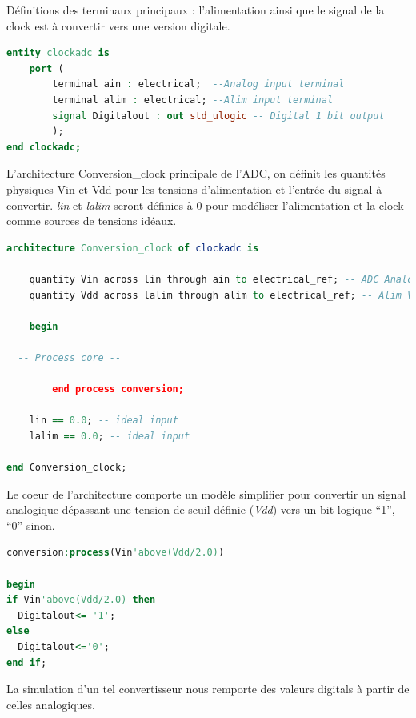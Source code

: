 \documentclass[a4paper]{article}
\begin{document}
D\'efinitions des terminaux principaux : l'alimentation ainsi que
le signal de la clock est \`a convertir vers une version digitale.
\begin{lstlisting}[language=VHDL, belowskip=-0.5 \baselineskip]
entity clockadc is
	port (
		terminal ain : electrical;  --Analog input terminal
		terminal alim : electrical; --Alim input terminal
		signal Digitalout : out std_ulogic -- Digital 1 bit output
		);
end clockadc;
\end{lstlisting}

\clearpage
L'architecture Conversion\_clock principale de l'ADC, on d\'efinit les
quantit\'es physiques Vin et Vdd pour les tensions d'alimentation et
l'entr\'ee du signal \`a convertir. \textit{lin} et \textit{lalim} seront
d\'efinies \`a 0 pour mod\'eliser l'alimentation et la clock comme sources de tensions
id\'eaux.

\begin{lstlisting}[language=VHDL, belowskip=-0.5 \baselineskip]
architecture Conversion_clock of clockadc is

	quantity Vin across lin through ain to electrical_ref; -- ADC Analog input
	quantity Vdd across lalim through alim to electrical_ref; -- Alim Vdd input

	begin

  -- Process core --

		end process conversion;

	lin == 0.0; -- ideal input
	lalim == 0.0; -- ideal input

end Conversion_clock;
\end{lstlisting}

Le coeur de l'architecture comporte un mod\`ele simplifier pour convertir un signal
analogique d\'epassant une tension de seuil d\'efinie (\textit{Vdd}) vers un bit logique
``1'', ``0'' sinon.
\begin{lstlisting}[language=VHDL, belowskip=-0.5 \baselineskip]
conversion:process(Vin'above(Vdd/2.0))

begin
if Vin'above(Vdd/2.0) then
  Digitalout<= '1';
else
  Digitalout<='0';
end if;
\end{lstlisting}

La simulation d'un tel convertisseur nous remporte des valeurs digitals \`a partir de
celles analogiques.
\end{document}

